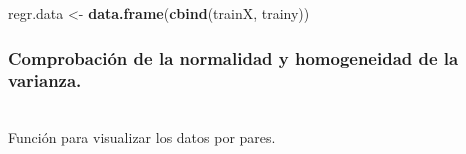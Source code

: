 \documentclass[
]{article}
\newenvironment{Shaded}{\begin{snugshade}}{\end{snugshade}}
\newcommand{\KeywordTok}[1]{\textcolor[rgb]{0.13,0.29,0.53}{\textbf{#1}}}
\newcommand{\NormalTok}[1]{#1}
\newcommand{\StringTok}[1]{\textcolor[rgb]{0.31,0.60,0.02}{#1}}
\begin{document}
\begin{Shaded}
\begin{Highlighting}[]
\NormalTok{regr.data <-}\StringTok{ }\KeywordTok{data.frame}\NormalTok{(}\KeywordTok{cbind}\NormalTok{(trainX, trainy))}
\end{Highlighting}
\end{Shaded}

\texttt{}

\hypertarget{comprobaciuxf3n-de-la-normalidad-y-homogeneidad-de-la-varianza.}{%
\subsubsection{Comprobación de la normalidad y homogeneidad de la
varianza.}\label{comprobaciuxf3n-de-la-normalidad-y-homogeneidad-de-la-varianza.}}

\texttt{}\\
Función para visualizar los datos por pares.\\
\texttt{}
\end{document}
